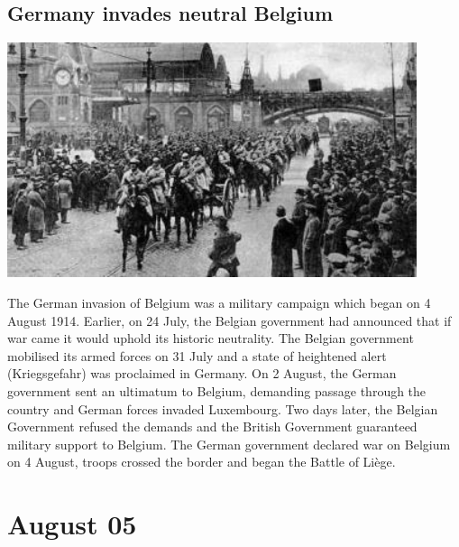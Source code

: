 \documentclass[11pt]{report}
\begin{document}
\subsection{Germany invades neutral Belgium}
\vspace{2mm}\begin{center}\includegraphics[width=12cm]{./img/germanyInBelgium.jpg}\end{center}
The German invasion of Belgium was a military campaign which began on 4 August 1914. Earlier, on 24 July, the Belgian government had announced that if war came it would uphold its historic neutrality. The Belgian government mobilised its armed forces on 31 July and a state of heightened alert (Kriegsgefahr) was proclaimed in Germany. On 2 August, the German government sent an ultimatum to Belgium, demanding passage through the country and German forces invaded Luxembourg. Two days later, the Belgian Government refused the demands and the British Government guaranteed military support to Belgium. The German government declared war on Belgium on 4 August, troops crossed the border and began the Battle of Liège.

\section{August 05}
\end{document}
